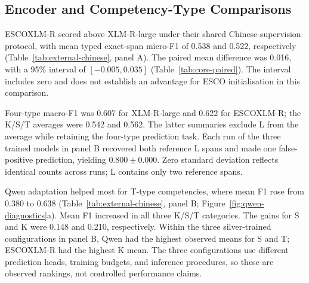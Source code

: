 \subsection{Encoder and Competency-Type Comparisons}
\label{sec:external-benchmark-results}

ESCOXLM-R scored above XLM-R-large under their shared Chinese-supervision protocol, with mean typed exact-span micro-F1 of 0.538 and 0.522, respectively (Table~\ref{tab:external-chinese}, panel A). The paired mean difference was 0.016, with a 95\% interval of $[-0.005, 0.035]$ (Table~\ref{tab:core-paired}). The interval includes zero and does not establish an advantage for ESCO initialisation in this comparison.

Four-type macro-F1 was 0.607 for XLM-R-large and 0.622 for ESCOXLM-R; the K/S/T averages were 0.542 and 0.562. The latter summaries exclude L from the average while retaining the four-type prediction task. Each run of the three trained models in panel B recovered both reference L spans and made one false-positive prediction, yielding $0.800\pm0.000$. Zero standard deviation reflects identical counts across runs; L contains only two reference spans.

Qwen adaptation helped most for T-type competencies, where mean F1 rose from 0.380 to 0.638 (Table~\ref{tab:external-chinese}, panel B; Figure~\ref{fig:qwen-diagnostics}a). Mean F1 increased in all three K/S/T categories. The gains for S and K were 0.148 and 0.210, respectively. Within the three silver-trained configurations in panel B, Qwen had the highest observed means for S and T; ESCOXLM-R had the highest K mean. The three configurations use different prediction heads, training budgets, and inference procedures, so these are observed rankings, not controlled performance claims.


